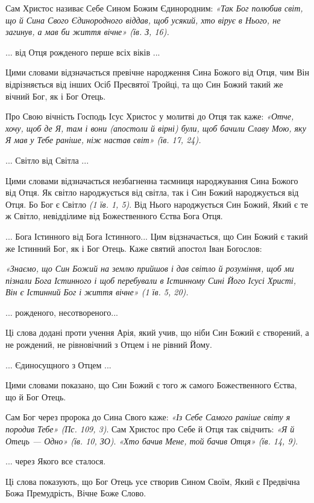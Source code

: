 \documentclass[main.tex]{subfiles}
\begin{document}
Сам Христос називає Себе Сином Божим Єдинородним: \emph{{\color{red} «Так Бог полюбив світ, що й Сина Свого Єдинородного віддав, щоб усякий, хто вірує в Нього, не загинув, а мав би життя вічне»} (їв. З, 16).}

... від Отця рожденого перше всіх віків ...

Цими словами відзначається превічне народження Сина Божого від Отця, чим Він відрізняється від інших Осіб Пресвятої Тройці, та що Син Божий такий же вічний Бог, як і Бог Отець.

Про Свою вічність Господь Ісус Христос у молитві до Отця так каже: \emph{{\color{red} «Отче, хочу, щоб де Я, там і вони (апостоли й вірні) були, щоб бачили Славу Мою, яку Я мав у Тебе раніше, ніж настав світ»} (їв. 17, 24).}

... Світло від Світла ...

Цими словами відзначається незбагненна таємниця народжування Сина Божого від Отця. Як світло народжується від світла, так і Син Божий народжується від Отця. Бо Бог є Світло \emph{(1 їв. 1, 5)}. Від Нього народжується Син Божий, Який є те ж Світло, невідділиме від Божественного Єства Бога Отця.
 
... Бога Істинного від Бога Істинного...
Цим відзначається, що Син Божий є такий же Істинний Бог, як і Бог Отець. Каже святий апостол Іван Богослов:
\begin{FlushRight}
    \emph{«Знаємо, що Син Божий на землю прийшов і дав світло й розуміння, щоб ми пізнали Бога Істинного і щоб перебували в Істинному Сині Його Ісусі Христі, Він є Істинний Бог і життя вічне» (1 їв. 5, 20).}
\end{FlushRight}

... рожденого, несотвореного...

Ці слова додані проти учення Арія, який учив, що ніби Син Божий є створений, а не рождений, не рівновічний з Отцем і не рівний Йому.

... Єдиносущного з Отцем ...

Цими словами показано, що Син Божий є того ж самого Божественного Єства, що й Бог Отець.

Сам Бог через пророка до Сина Свого каже: \emph{{\color{red} «Із Себе Самого раніше світу я породив Тебе»} (Пс. 109, 3)}.
Сам Христос про Себе й Отця так свідчить: \emph{{\color{red} «Я й Отець — Одно»} (їв. 10, ЗО)}. \emph{{\color{red} «Хто бачив Мене, той бачив Отця»} (їв. 14, 9)}.

... через Якого все сталося.

Ці слова показують, що Бог Отець усе створив Сином Своїм, Який є Предвічна Божа Премудрість, Вічне Боже Слово.
\end{document}
